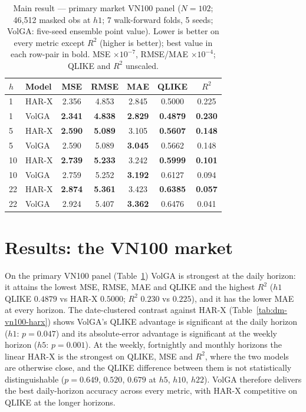 \documentclass{llncs}
\begin{document}
\begin{table}[t]
\centering
\caption{Main result --- primary market VN100 panel ($N=102$; 46{,}512 masked obs at $h1$; 7
walk-forward folds, 5 seeds; VolGA: five-seed ensemble point value). Lower is better on every metric
except $R^2$ (higher is better); best value in each row-pair in bold. MSE $\times10^{-7}$, RMSE/MAE
$\times10^{-4}$; QLIKE and $R^2$ unscaled.}
\label{tab:vn100main}
\footnotesize
\setlength{\tabcolsep}{6pt}
\begin{tabular}{llccccc}
\toprule
$h$ & Model & MSE & RMSE & MAE & QLIKE & $R^2$ \\
\midrule
1 & HAR-X & 2.356 & 4.853 & 2.845 & 0.5000 & 0.225 \\
1 & VolGA & \textbf{2.341} & \textbf{4.838} & \textbf{2.829} & \textbf{0.4879} & \textbf{0.230} \\
\midrule
5 & HAR-X & \textbf{2.590} & \textbf{5.089} & 3.105 & \textbf{0.5607} & \textbf{0.148} \\
5 & VolGA & 2.590 & 5.089 & \textbf{3.045} & 0.5662 & 0.148 \\
\midrule
10 & HAR-X & \textbf{2.739} & \textbf{5.233} & 3.242 & \textbf{0.5999} & \textbf{0.101} \\
10 & VolGA & 2.759 & 5.252 & \textbf{3.192} & 0.6127 & 0.094 \\
\midrule
22 & HAR-X & \textbf{2.874} & \textbf{5.361} & 3.423 & \textbf{0.6385} & \textbf{0.057} \\
22 & VolGA & 2.924 & 5.407 & \textbf{3.362} & 0.6476 & 0.041 \\
\bottomrule
\end{tabular}
\end{table}

\section{Results: the VN100 market}\label{sec:results}
On the primary VN100 panel (Table~\ref{tab:vn100main}) VolGA is strongest at the daily horizon: it
attains the lowest MSE, RMSE, MAE and QLIKE and the highest $R^2$ ($h1$ QLIKE $0.4879$ vs HAR-X
$0.5000$; $R^2$ $0.230$ vs $0.225$), and it has the lower MAE at every horizon. The date-clustered
contrast against HAR-X (Table~\ref{tab:dm-vn100-harx}) shows VolGA's QLIKE advantage is significant at
the daily horizon ($h1$: $p=0.047$) and its absolute-error advantage is significant at the weekly
horizon ($h5$: $p=0.001$). At the weekly, fortnightly and
monthly horizons the linear HAR-X is the strongest on QLIKE, MSE and $R^2$, where the two models are
otherwise close, and the QLIKE difference between them is not statistically distinguishable
($p=0.649$, $0.520$, $0.679$ at $h5$, $h10$, $h22$). VolGA therefore delivers the best daily-horizon
accuracy across every metric, with HAR-X competitive on QLIKE at the longer horizons.
\end{document}
